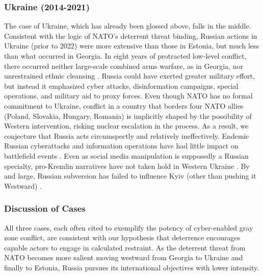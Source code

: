 \documentclass[11pt,letterpaper,pdftex,dvipsnames,table]{article}
\begin{document}
\subsubsection{Ukraine (2014-2021)}
The case of Ukraine, which has already been glossed above, falls in the middle. Consistent with the logic of NATO's deterrent threat binding, Russian actions in Ukraine (prior to 2022) were more extensive than those in Estonia, but much less than what occurred in Georgia. In eight years of protracted low-level conflict, there occurred neither large-scale combined arms warfare, as in Georgia, nor unrestrained ethnic cleansing \citep{driscoll_socialmediarussian_2020}. Russia could have exerted greater military effort, but instead it emphasized cyber attacks, disinformation campaigns, special operations, and military aid to proxy forces. Even though NATO has no formal commitment to Ukraine, conflict in a country that borders four NATO allies (Poland, Slovakia, Hungary, Romania) is implicitly shaped by the possibility of Western intervention, risking nuclear escalation in the process. As a result, we conjecture that Russia acts circumspectly and relatively ineffectively. Endemic Russian cyberattacks and information operations have had little impact on battlefield events \citep{kostyuk_invisibledigitalfront_2019}. Even as social media manipulation is supposedly a Russian specialty, pro-Kremlin narratives have not taken hold in Western Ukraine \citep{driscoll_socialmediarussian_2020}. By and large, Russian subversion has failed to influence Kyiv (other than pushing it Westward) \citep{maschmeyer_subversivetrilemmawhy_2021}.

\subsubsection{Discussion of Cases}
All three cases, each often cited to exemplify the potency of cyber-enabled gray zone conflict, are consistent with our hypothesis that deterrence encourages capable actors to engage in calculated restraint. As the deterrent threat from NATO becomes more salient moving westward from Georgia to Ukraine and finally to Estonia, Russia pursues its international objectives with lower intensity.
\end{document}
